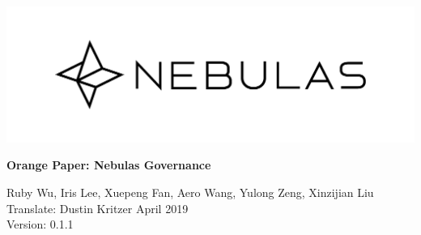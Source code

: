 \documentclass[12pt]{article}
\begin{document}
\pagestyle{empty}

\pagecolor{\pcolor}

\begin{titlepage}
  \begin{center}
    \vspace*{5.5cm}
    \includegraphics[scale=0.4]{../common/Nebulas.png}
    \vspace{0.5cm}


    \textbf{\huge{Orange Paper: Nebulas Governance}}

    \vspace{0.5cm}
    Ruby Wu, Iris Lee, Xuepeng Fan, Aero Wang, Yulong Zeng, Xinzijian Liu \\
    Translate: Dustin Kritzer
    \vfill
    April 2019\\
    Version: 0.1.1
    \textbf{}
  \end{center}

\end{titlepage}
\setcounter{page}{0}
\tableofcontents
\newpage
\setcounter{page}{1}
\pagestyle{fancy}
\vspace*{0.01cm}





\newpage


\newpage
\begin{appendices}


\newpage

\end{appendices}
\end{document}
